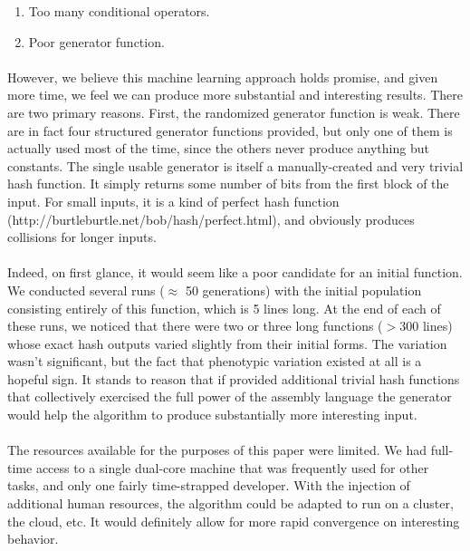 \documentclass{article}
\begin{document}
\begin{enumerate}
\item Too many conditional operators.
\item Poor generator function.
\end{enumerate}

\paragraph{}

However, we believe this machine learning approach holds promise, and given more time, we feel we can produce more substantial and interesting results. There are two primary reasons. First, the randomized generator function is weak. There are in fact four structured generator functions provided, but only one of them is actually used most of the time, since the others never produce anything but constants. The single usable generator is itself a manually-created and very trivial hash function. It simply returns some number of bits from the first block of the input. For small inputs, it is a kind of perfect hash function (http://burtleburtle.net/bob/hash/perfect.html), and obviously produces collisions for longer inputs.

\paragraph{}
Indeed, on first glance, it would seem like a poor candidate for an initial function. We conducted several runs ($\approx$ 50 generations) with the initial population consisting entirely of this function, which is 5 lines long. At the end of each of these runs, we noticed that there were two or three long functions ($>$300 lines) whose exact hash outputs varied slightly from their initial forms. The variation wasn't significant, but the fact that phenotypic variation existed at all is a hopeful sign. It stands to reason that if provided additional trivial hash functions that collectively exercised the full power of the assembly language the generator would help the algorithm to produce substantially more interesting input.

\paragraph{}
The resources available for the purposes of this paper were limited. We had full-time access to a single dual-core machine that was frequently used for other tasks, and only one fairly time-strapped developer. With the injection of additional human resources, the algorithm could be adapted to run on a cluster, the cloud, etc. It would definitely allow for more rapid convergence on interesting behavior.

\end{document}
